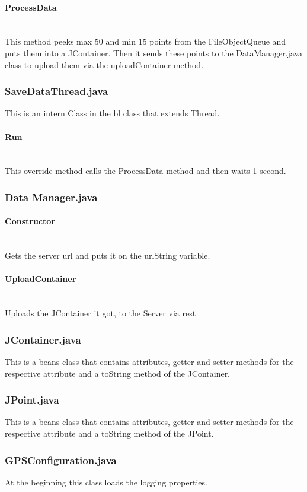 \paragraph{ProcessData}\mbox{}\\
This method peeks max 50 and min 15 points from the FileObjectQueue and puts them into a JContainer. Then it sends these points to the DataManager.java class to upload them via the uploadContainer method.
\subsubsection{SaveDataThread.java}
This is an intern Class in the \gls{bl} class that extends Thread.
\paragraph{Run}\mbox{}\\
This override method calls the ProcessData method and then waits 1 second.
\subsubsection{Data Manager.java}
\paragraph{Constructor}\mbox{}\\
Gets the server \gls{url} and puts it on the urlString variable.
\paragraph{UploadContainer}\mbox{}\\
Uploads the JContainer it got, to the Server via \gls{rest} 
\subsubsection{JContainer.java}
This is a beans class that contains attributes, getter and setter methods for the respective attribute and a toString method of the JContainer.
\subsubsection{JPoint.java}
This is a beans class that contains attributes, getter and setter methods for the respective attribute and a toString method of the JPoint.
\subsubsection{GPSConfiguration.java}
At the beginning this class loads the logging properties.
